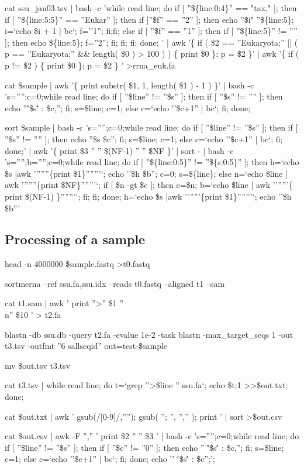 \documentclass[a4paper]{article}
\begin{document}
\small{
cat ssu\_jan03.tsv | bash -c 'while read line; do if [ ''\$\{line:0:4\}'' == "tax," ]; then if [ ''\$\{line:5:5\}'' == ''Eukar'' ]; then if [''\$f'' == ''2'' ]; then echo ''\$i" ''\$\{line:5\}; i=`echo \$i + 1 | bc`; f=''1''; fi;fi;  else if [ ''\$f'' == ''1'' ]; then if [ ''\$\{line:5\}'' != '''' ]; then echo \$\{line:5\}; f=''2''; fi; fi; fi; done; ' | awk '\{ if ( \$2 == ''Eukaryota;'' || ( p == ''Eukaryota;'' \&\& length( \$0 ) > 100 ) ) \{ print \$0 \}; p = \$2 \}' | awk '\{ if ( p != \$2 ) \{ print \$0 \}; p = \$2 \} ' >rrna\_euk.fa

cat \$sample | awk '\{ print substr( \$1, 1, length( \$1 ) - 1 ) \}' | bash -c 's='''';c=0;while read line; do if [ ''\$line'' != ''\$s'' ]; then if [ ''\$s'' != '''' ]; then echo ''\''\$s\'' : \$c,''; fi; s=\$line; c=1; else c=`echo ''\$c+1'' | bc`; fi; done;

sort \$sample |  bash -c 's='''';c=0;while read line; do if [ ''\$line'' != ''\$s'' ]; then if [ ''\$s'' != '''' ]; then echo ''\$s \$c''; fi; s=\$line; c=1; else c=`echo ''\$c+1'' | bc`; fi; done;' | awk '\{ print \$3 '' '' \$(NF-1) '' '' \$NF \}' | sort - | bash -c 's='''';b='''';c=0;while read line; do if [ ''\$\{line:0:5\}'' != ''\$\{s:0:5\}'' ]; then h=`echo \$s |awk '''''''\{print \$1\}'''''''`; echo ''\$h \$b''; c=0; s=\$\{line\}; else n=`echo \$line | awk '''''''\{print \$NF\}'''''''`; if [ \$n -gt \$c ]; then c=\$n; b=`echo \$line | awk '''''''\{ print \$(NF-1) \}'''''''`; fi; fi; done; h=`echo \$s |awk '''''''\{print \$1\}'''''''`; echo ''\$h \$b'''

}


\subsection{Processing of a sample}

\small{
head -n 4000000 \$sample.fastq >t0.fastq

sortmerna --ref ssu.fa,ssu.idx --reads t0.fastq --aligned t1 --sam

cat t1.sam | awk '{ print ''>'' \$1 ''\\n'' \$10 }' > t2.fa

blastn -db ssu.db -query t2.fa -evalue 1e-2 -task blastn -max\_target\_seqs 1 -out t3.tsv -outfmt ''6 sallseqid''
out=test-\${sample}

mv \${out}.tsv t3.tsv

cat t3.tsv | while read line; do t=`grep ''>\$line '' ssu.fa`; echo \${t:1} >>\$out.txt; done;

cat \$out.txt | awk '{ gsub(/[0-9]/,''''); gsub( ''; '', '','' ); print }' | sort >\${out}.csv

cat \$out.csv | awk -F '','' '{ print \$2 '' '' \$3 }' | bash -c 's='''';c=0;while read line; do if [ ''\$line'' != ''\$s'' ]; then if [ ''\$c'' != ''0'' ]; then echo ''  \''\$s\'' : \$c,''; fi; s=\$line; c=1; else c=`echo ''\$c+1'' | bc`; fi; done; echo ''  \''\$s\'' : \$c'';'; 

} 
\end{document}
